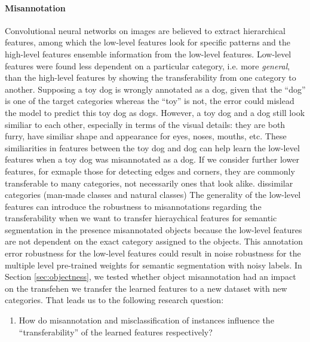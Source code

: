 \paragraph{Misannotation}
Convolutional neural networks on images are believed to extract hierarchical features, among which the low-level features look for specific patterns and the high-level features ensemble information from the low-level features.
Low-level features were found\cite{yosinski2014transferable} less dependent on a particular category, i.e. more \textit{general}, than the high-level features by showing the transferability from one category to another.
Supposing a toy dog is wrongly annotated as a dog, given that the ``dog'' is one of the target categories whereas the ``toy'' is not, the error could mislead the model to predict this toy dog as dogs.
However, a toy dog and a dog still look similiar to each other, especially in terms of the visual details: they are both furry, have similiar shape and appearance for eyes, noses, mouths, etc.
These similiarities in features between the toy dog and dog can help learn the low-level features when a toy dog was misannotated as a dog.
If we consider further lower features, for exmaple those for detecting edges and corners, they are commonly transferable to many categories, not necessarily ones that look alike.
dissimilar categories (man-made classes and natural classes)
The generality of the low-level features can introduce the robustness to misannotations regarding the transferability when we want to transfer hieraychical features for semantic segmentation in the presence misannotated objects because the low-level features are not dependent on the exact category assigned to the objects.
This annotation error robustness for the low-level features could result in noise robustness for the multiple level pre-trained weights for semantic segmentation with noisy labels.
In Section \ref{sec:objectness}, we tested whether object misannotation had an impact on the transfehen we transfer the learned features to a new dataset with new categories.
That leads us to the following research question:
\begin{enumerate}
  \item How do misannotation and misclassification of instances influence the ``transferability'' of the learned features respectively?
\end{enumerate}
